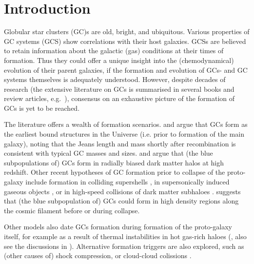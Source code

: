 \documentclass[a4paper,fleqn,usenatbib]{mnras}
\begin{document}
\section{Introduction}
Globular star clusters (GC)s are old, bright, and ubiquitous. Various properties of
GC systems (GCS) show correlations with their host galaxies. GCSs are believed to
retain information about the galactic (gas) conditions at their times of formation.
Thus they could offer a unique insight into the (chemodynamical) evolution of their 
parent galaxies, if the formation and evolution of GCs- and GC systems themselves 
is adequately understood. However, despite decades of research (the extensive 
literature on GCs is summarised in several books and review articles, e.g.~\citealt{
1991ARA&A..29..543H, Harris2001, 2004Natur.427...31W, 2006ARA&A..44..193B, 
2012A&ARv..20...50G, 2014CQGra..31x4006K, 2018RSPSA.47470616F}), consensus on an 
exhaustive picture of the formation of GCs is yet to be reached.

The literature offers a wealth of formation scenarios. \citet{1968ApJ...154..891P}
and \citet{1984ApJ...277..470P} argue that GCs form as the earliest bound
structures in the Universe (i.e. prior to formation of the main galaxy), 
noting that the Jeans length and mass shortly after recombination is consistent
with typical GC masses and sizes. \citet{2005MNRAS.364..367D} and \citet{
2009ApJ...706L.192B} argue that (the blue subpopulations of) GCs form in radially
biased dark matter halos at high redshift. Other recent hypotheses of GC formation 
prior to collapse of the proto-galaxy include formation in colliding supershells 
\citep{2017Ap&SS.362..183R}, in supersonically induced gaseous objects
\citep{2019arXiv190408941C}, or in high-speed collisions of dark matter subhaloes
\citep{2019arXiv190508951M}. \citet{2017MNRAS.472.3120B} suggests
that (the blue subpopulation of) GCs could form in high density regions along
the cosmic filament before or during collapse.

Other models also date GCs formation during formation of the proto-galaxy itself,
for example as a result of thermal instabilities in hot gas-rich haloes 
(\citealt{1985ApJ...298...18F}, also see the discussions in \citealt{
1990ApJ...363..488K}). Alternative formation triggers are also explored, such as 
(other causes of) shock compression, or cloud-cloud colissions \citep[e.g.][]{
1980glcl.conf..301G, 1992ApJ...400..265M, 1994ApJ...429..177H, 1995ApJ...442..618V,
1996ASPC...92..241L, 2001ApJ...560..592C}. 
\end{document}
